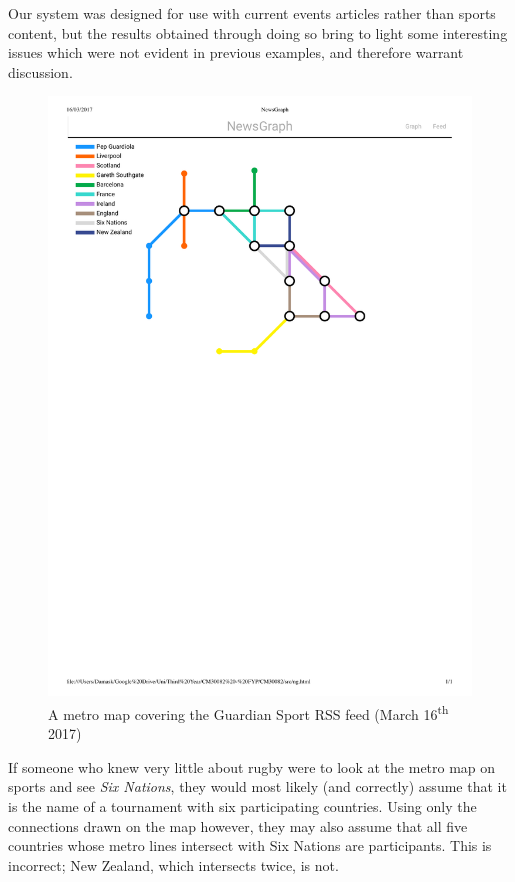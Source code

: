 Our system was designed for use with current events articles rather than sports content, but the results obtained through doing so bring to light some interesting issues which were not evident in previous examples, and therefore warrant discussion.
\begin{figure}[htbp!]
	\centering
	\includegraphics[width=\textwidth]{img/results/guardian-sport.pdf}
	\caption{A metro map covering the Guardian Sport RSS feed (March 16\textsuperscript{th} 2017)}
	\label{fig:guardian-sport}
\end{figure}

If someone who knew very little about rugby were to look at the metro map on sports and see \textit{Six Nations}, they would most likely (and correctly) assume that it is the name of a tournament with six participating countries. Using only the connections drawn on the map however, they may also assume that all five countries whose metro lines intersect with Six Nations are participants. This is incorrect; New Zealand, which intersects twice, is not.

